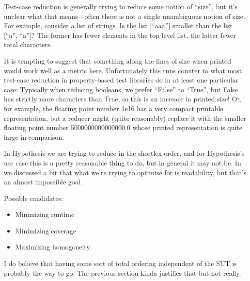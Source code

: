 Test-case reduction is generally trying to reduce some notion of ``size'',
but it's unclear what that means---often there is not a single unambiguous notion of size.
For example,
consider a list of strings.
Is the list [``aaa''] smaller than the list [``a'', ``a'']?
The former has fewer elements in the top level list,
the latter fewer total characters.

It is tempting to suggest that something along the lines of size when printed would work well as a metric here.
Unfortunately this runs counter to what most test-case reduction in property-based test libraries do in at least one particular case:
Typically when reducing booleans,
we prefer ``False'' to ``True'',
but False has strictly more characters than True,
so this is an increase in printed size!
Or,
for example,
the floating point number 1e16 has a very compact printable representation,
but a reducer might (quite reasonably) replace it with the smaller floating point number 5000000000000000.0 whose printed representation is quite large in comparison.

In Hypothesis we are trying to reduce in the shortlex order,
and for Hypothesis's use case this is a pretty reasonable thing to do,
but in general it may not be.
In \cite{chen_et_al:DR:2018:8676} we discussed a bit that what we're trying to optimise for is readability,
but that's an almost impossible goal.

Possible candidates:

\begin{itemize}
\item Minimizing runtime
\item Minimizing coverage
\item Maximizing homogoneity
\end{itemize}

I do believe that having some sort of total ordering independent of the SUT is probably the way to go.
The previous section kinda justifies that but not really.
